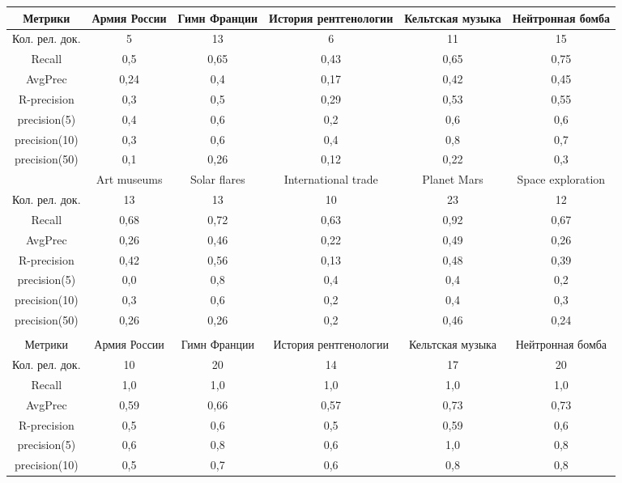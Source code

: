 \begin{table}[ht]
\begin{adjustbox}{width=0.9\textwidth}
\begin{tabular}{ c  c  c  c  c  c }
			\hline
			Метрики & Армия России & Гимн Франции & История рентгенологии &  Кельтская музыка &  Нейтронная бомба \\
			\hline
			Кол. рел. док. & 5 & 13 & 6 & 11 & 15  \\
			Recall & 0,5 & 0,65 & 0,43 & 0,65 & 0,75 \\
			AvgPrec & 0,24 & 0,4 & 0,17 & 0,42 & 0,45  \\
			R-precision & 0,3 & 0,5 & 0,29 & 0,53 & 0,55  \\
			precision(5) & 0,4 & 0,6 & 0,2 & 0,6 & 0,6  \\
			precision(10) & 0,3 & 0,6 & 0,4 & 0,8 & 0,7  \\
			precision(50) & 0,1 & 0,26 & 0,12 & 0,22 & 0,3  \\
			\hline
			& Art museums & Solar flares & International trade &  Planet Mars &  Space exploration \\
			\hline
			Кол. рел. док. & 13 & 13 & 10 & 23 & 12  \\
			Recall & 0,68 & 0,72 & 0,63 & 0,92 & 0,67 \\
			AvgPrec & 0,26 & 0,46 & 0,22 & 0,49 & 0,26  \\
			R-precision & 0,42 & 0,56 & 0,13 & 0,48 & 0,39  \\
			precision(5) & 0,0 & 0,8 & 0,4 & 0,4 & 0,2  \\
			precision(10) & 0,3 & 0,6 & 0,2 & 0,4 & 0,3  \\
			precision(50) & 0,26 & 0,26 & 0,2 & 0,46 & 0,24  \\
			\hline
			\\
			\hline
			Метрики & Армия России & Гимн Франции & История рентгенологии &  Кельтская музыка &  Нейтронная бомба \\
			\hline
			Кол. рел. док. & 10 & 20 & 14 & 17 & 20  \\
			Recall & 1,0 & 1,0 & 1,0 & 1,0 & 1,0 \\
			AvgPrec & 0,59 & 0,66 & 0,57 & 0,73 & 0,73  \\
			R-precision & 0,5 & 0,6 & 0,5 & 0,59 & 0,6  \\
			precision(5) & 0,6 & 0,8 & 0,6 & 1,0 & 0,8  \\
			precision(10) & 0,5 & 0,7 & 0,6 & 0,8 & 0,8  \\

\end{tabular}
\end{adjustbox}
\end{table}
